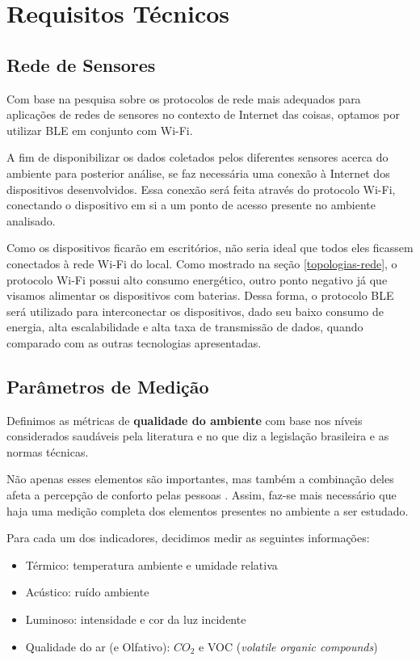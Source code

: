 \documentclass[../monografia.tex]{subfiles}
\begin{document}
\section{Requisitos Técnicos}


\subsection{Rede de Sensores}

Com base na pesquisa sobre os protocolos de rede mais adequados para aplicações de redes de sensores no contexto de Internet das coisas, optamos por utilizar BLE em conjunto com Wi-Fi. 

A fim de disponibilizar os dados coletados pelos diferentes sensores acerca do ambiente para posterior análise, se faz necessária uma conexão à Internet dos dispositivos desenvolvidos. Essa conexão será feita através do protocolo Wi-Fi, conectando o dispositivo em si a um ponto de acesso presente no ambiente analisado.

Como os dispositivos ficarão em escritórios, não seria ideal que todos eles ficassem conectados à rede Wi-Fi do local. Como mostrado na seção \ref{topologias-rede}, o protocolo Wi-Fi possui alto consumo energético, outro ponto negativo já que visamos alimentar os dispositivos com baterias. Dessa forma, o protocolo BLE será utilizado para interconectar os dispositivos, dado seu baixo consumo de energia, alta escalabilidade e alta taxa de transmissão de dados, quando comparado com as outras tecnologias apresentadas.

\subsection{Parâmetros de Medição} \label{specs-parametros}

Definimos as métricas de \textbf{qualidade do ambiente} com base nos níveis considerados saudáveis pela literatura e no que diz a legislação brasileira e as normas técnicas. 

Não apenas esses elementos são importantes, mas também a combinação deles afeta a percepção de conforto pelas pessoas \cite{ComfortOffice}. Assim, faz-se mais necessário que haja uma medição completa dos elementos presentes no ambiente a ser estudado.  

Para cada um dos indicadores, decidimos medir as seguintes informações:

\begin{itemize}
\item Térmico: temperatura ambiente e umidade relativa
\item Acústico: ruído ambiente
\item Luminoso: intensidade e cor da luz incidente
\item Qualidade do ar (e Olfativo): $CO_{2}$ e VOC (\textit{volatile organic compounds})
\end{itemize}
\end{document}
